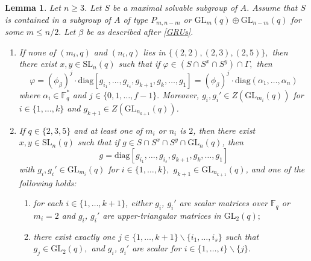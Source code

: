 \documentclass[a4paper,reqno,11pt]{amsart}
\newtheorem{Lem}[Th]{Lemma}
\theoremstyle{definition}
\theoremstyle{remark}
\numberwithin{equation}{section}
\newcommand{\diag}{\mathrm{diag}}
\newcommand{\SL}{{\mathrm{SL}}}
\newcommand{\GL}{{\mathrm{GL}}}
\begin{document}
\begin{Lem}
\label{GRdiag}
Let $n \ge 3$. Let  $S$ be a maximal solvable subgroup of $A$. Assume that $S$ is contained in a subgroup of $A$ of type $P_{m,n-m}$ or $\GL_m(q) \oplus \GL_{n-m}(q)$ for some $m \le n/2.$ Let $\beta$ be as described after \eqref{GRUs}.
\begin{enumerate}
\item[$(1)$] If none of $(m_i, q)$ and $(n_i,q)$ lies in $\{(2,2), (2,3), (2,5)\},$ then there exist $x, y \in \SL_n(q)$ such that if $\varphi \in (S \cap S^x \cap S^y) \cap \Gamma,$ then 
\begin{equation}
\label{GRvarphdiagc1}
\varphi=(\phi_{\beta})^j \cdot \diag[g_{i_1}, \ldots,g_{i_s}, g_{k+1}, g_k, \ldots,  g_1]=(\phi_{\beta})^j \cdot \diag(\alpha_1, \ldots, \alpha_n)
\end{equation}
 where $\alpha_i \in \mathbb{F}_q^*$ and $j \in \{0,1, \ldots, f-1\}.$ Moreover, $g_i, g_i' \in Z(\GL_{m_i}(q))$ for $i \in \{1, \ldots, k\}$ and $g_{k+1} \in Z(\GL_{n_{k+1}}(q))$.
\item[$(2)$] If $q \in \{2,3,5\}$ and at least one of $m_i$ or $n_i$ is $2$, then there exist $x,y \in \SL_n(q)$ such that if $g \in S \cap S^x \cap S^y \cap \GL_n(q)$, then $$g=\diag[g_{i_1}, \ldots,g_{i_s}, g_{k+1}, g_k, \ldots,  g_1]$$ with $g_i, g_i' \in \GL_{m_i}(q)$ for $i \in \{1, \ldots, k\},$ $g_{k+1} \in \GL_{n_{k+1}}(q)$, and one of the following holds:
\begin{enumerate} 
\item[$(2a)$]  for each $i \in \{1, \ldots, k+1\}$, either  $g_i$, $g_i'$ are  scalar matrices over $\mathbb{F}_q$ or $m_i=2$ and  $g_i$, $g_i'$ are upper-triangular matrices in $\GL_2(q);$
\item[$(2b)$] there exist exactly one $j \in \{1, \ldots, k+1\} \backslash \{i_1, \ldots, i_s\}$ such that $g_j \in \GL_2(q),$ and $g_i$, $g_i'$ are scalar for $i \in \{1, \ldots, t\} \backslash \{j\}.$
\end{enumerate}
\end{enumerate}
\end{Lem}
\end{document}
